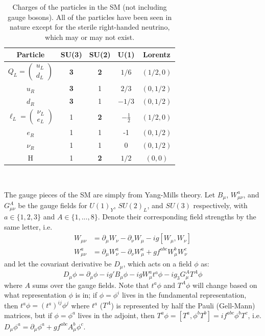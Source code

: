 \documentclass[11pt, oneside]{article}   	%
\theoremstyle{definition}
\numberwithin{equation}{subsection}		%
\begin{document}
\begin{table}[H]
	\centering
	\begin{tabular}{ | c | c | c | c | c | }
		\hline
		Particle & SU(3) & SU(2) & U(1) & Lorentz \\
		\hline
		$Q_L = \begin{pmatrix} u_L \\ d_L \end{pmatrix}$ & \textbf{3} & \textbf{2} & $1/6$ & $(1/2, 0)$ \\
		\hline
		$u_R$ & \textbf{3} & 1 & $2/3$ & $(0, 1/2)$ \\
		\hline
		$d_R$ & \textbf{3} & 1 & $-1/3$ & $(0, 1/2)$ \\
		\hline
		$\ell_L = \begin{pmatrix} \nu_L \\ e_L \end{pmatrix}$ & 1 & \textbf{2} & $-\frac{1}{2}$ & $(1/2, 0)$ \\
		\hline
		$e_R$ & 1 & 1 & -1 &  $(0, 1/2)$ \\
		\hline
		$\nu_R$ & 1 & 1 & 0 & $(0, 1/2)$ \\
		\hline
		H & 1 & \textbf{2} & $1/2$ & $(0, 0)$ \\ 
		\hline
	\end{tabular}
	\caption{Charges of the particles in the SM (not including gauge bosons). All of the particles have been 
	seen in nature except for the sterile right-handed neutrino, which may or may not exist. }~
	\label{table:charges}
\end{table}

The gauge pieces of the SM are simply from Yang-Mills theory. Let $B_{\mu}$, $W_{\mu\nu}^a$, and $G_{\mu\nu}^A$ be the 
gauge fields for $U(1)_Y$, $SU(2)_L$, and $SU(3)$ respectively, with $a \in \{1, 2, 3\}$ and $A\in \{1, ..., 8\}$. Denote their 
corresponding field strengths by the same letter, i.e. 
\begin{align}
	W_{\mu\nu} &= \partial_\mu W_{\nu} - \partial_\nu W_\mu - i g [W_\mu, W_\nu] \\
	W_{\mu\nu}^a &= \partial_\mu W_\nu^a - \partial_\nu W_\mu^a + g f^{abc} W_\mu^b W_\nu^c
\end{align}
and let the covariant derivative be $D_\mu$, which acts on a field $\phi$ as:
\begin{equation}
	D_\mu\phi = \partial_\mu\phi - ig' B_\mu \phi - ig W_\mu^a t^a \phi - ig_3 G_\mu^A T^A\phi
\end{equation}
where $A$ sums over the gauge fields. Note that $t^a \phi$ and $T^A\phi$ will change based on what representation $\phi$ 
is in; if $\phi = \phi^i$ lives in the fundamental representation, then $t^a\phi = (t^a)^{ij}\phi^j$ where $t^a$ ($T^A$) is 
represented by half the Pauli (Gell-Mann) matrices, but if $\phi = \phi^a$ lives in the adjoint, then $T^a \phi = [T^a, \phi^b T^b] 
= if^{abc} \phi^bT^c$, i.e. $D_\mu\phi^a = \partial_\mu\phi^a + g f^{abc} A_\mu^b \phi^c$. 
\end{document}
